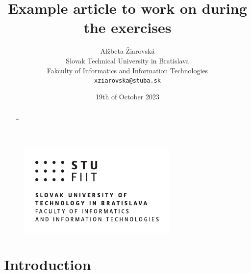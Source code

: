 \documentclass[10pt,twocolumn,twoside,slovak,a4paper]{article}
\title{Example article to work on during the exercises}
\author{Alžbeta Žiarovská\\[2pt]
	{\small Slovak Technical University in Bratislava}\\
	{\small Fakculty of Informatics and Information Technologies}\\
	{\small \texttt{xziarovska@stuba.sk}}
	}
\date{\small 19th of October 2023}
\begin{document}
\maketitle

\begin{abstract}
\ldots
\end{abstract}

\newpage


\begin{figure}
\flushleft
\includegraphics[scale=1]{logo.pdf}
\label{fig:logo}
\end{figure}

\section{Introduction}
\end{document}
